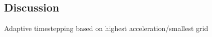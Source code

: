 \documentclass[twoside]{article}
\begin{document}
\begin{multicols}{2}

\section{Discussion}

Adaptive timestepping based on highest acceleration/smallest grid






\end{multicols}
\end{document}
